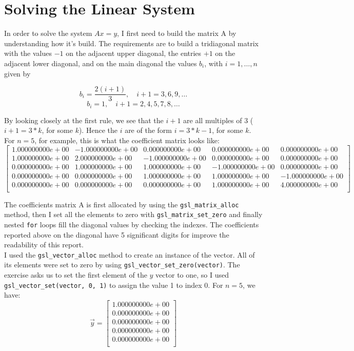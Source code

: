 \documentclass{article}
\newcommand{\code}{\texttt}
\begin{document}
\section{Solving the Linear System}
In order to solve the system $Ax=y$, I first need to build the matrix A by understanding how it's build. The requirements are to build a tridiagonal matrix with the values $-1$ on the adjacent upper diagonal, the entries $+1$ on the adjacent lower diagonal, and on the main diagonal the values $b_{i}$, with $i = 1, \ldots, n$ given by

$$b_i =\frac{2(i+1)}{3},\quad i + 1= 3, 6, 9,\ldots$$
$$b_i =1,\quad i + 1 = 2, 4, 5, 7, 8, \ldots$$

By looking closely at the first rule, we see that the $i+1$ are all multiples of 3 ($i+1 = 3*k$, for some $k$). Hence the $i$ are of the form $i = 3*k-1$, for some $k$. For $n = 5$, for example, this is what the coefficient matrix looks like:
$$
\begin{bmatrix}
1.000000000e+00 & -1.000000000e+00 & 0.000000000e+00 & 0.000000000e+00 & 0.000000000e+00 \\ 
1.000000000e+00 & 2.000000000e+00 & -1.000000000e+00 & 0.000000000e+00 & 0.000000000e+00 \\ 
0.000000000e+00 & 1.000000000e+00 & 1.000000000e+00 & -1.000000000e+00 & 0.000000000e+00 \\ 
0.000000000e+00 & 0.000000000e+00 & 1.000000000e+00 & 1.000000000e+00 & -1.000000000e+00 \\ 
0.000000000e+00 & 0.000000000e+00 & 0.000000000e+00 & 1.000000000e+00 & 4.000000000e+00 \\
\end{bmatrix}
$$

The coefficients matrix A is first allocated by using the \code{gsl\_matrix\_alloc} method, then I set all the elements to zero with \code{gsl\_matrix\_set\_zero} and finally nested \code{for} loops fill the diagonal values by checking the indexes. The coefficients reported above on the diagonal have 5 significant digits for improve the readability of this report.\\

I used the \code{gsl\_vector\_alloc} method to create an instance of the vector. All of its elements were set to zero by using \code{gsl\_vector\_set\_zero(vector)}. The exercise asks us to set the first element of the $y$ vector to one, so I used \code{gsl\_vector\_set(vector, 0, 1)} to assign the value 1 to index 0. For $n=5$, we have:
$$
\vec{y}=
\begin{bmatrix}
1.000000000e+00 \\
0.000000000e+00 \\
0.000000000e+00 \\
0.000000000e+00 \\
0.000000000e+00 \\
\end{bmatrix}
$$
\end{document}
